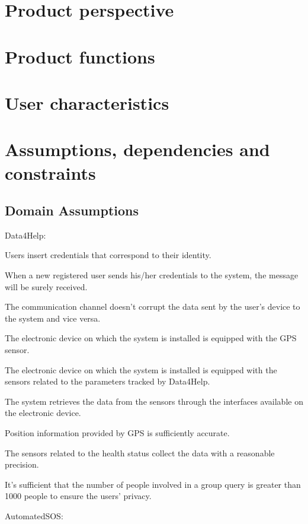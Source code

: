 \section{Product perspective}
\section{Product functions}
\section{User characteristics}
\section{Assumptions, dependencies and constraints}
\subsection{Domain Assumptions}
Data4Help:  
\begin{enumerate} [label={[D\arabic*]}]
    \item Users insert credentials that correspond to their identity.
    \item When a new registered user sends his/her credentials to the system, the message will be surely received.
    \item The communication channel doesn't corrupt the data sent by the user's device to the system and vice versa.
    \item The electronic device on which the system is installed is equipped with the GPS sensor.
    \item The electronic device on which the system is installed is equipped with the sensors related to the parameters tracked by Data4Help.
    \item The system retrieves the data from the sensors through the interfaces available on the electronic device.
    \item Position information provided by GPS is sufficiently accurate\cite{gps}.
    \item The sensors related to the health status collect the data with a reasonable precision.
    \item It's sufficient that the number of people involved in a group query is greater than 1000 people to ensure the users' privacy.
    \item 
\end{enumerate}  
\noindent
AutomatedSOS:
